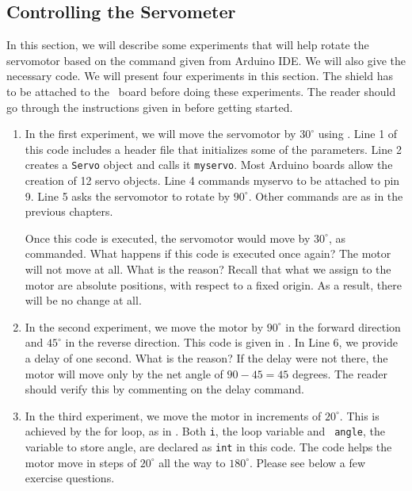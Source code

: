 \subsection{Controlling the Servometer}
\label{sec:servo-ard}
In this section, we will describe some experiments that will help
rotate the servomotor based on the command given from Arduino IDE.  We
will also give the necessary code.  We will present four experiments
in this section.  The shield has to be attached to the \arduino\ board
before doing these experiments.  The reader should go through the
instructions given in  before getting started.
\begin{enumerate}
\item In the first experiment, we will move the servomotor by
  $30^\circ$ using .  Line 1 of this code
  includes a header file that initializes some of the parameters.
  Line 2 creates a {\tt Servo} object and calls it {\tt myservo}.
  Most Arduino boards allow the creation of 12 servo objects.  Line 4
  commands myservo to be attached to pin 9.  Line 5 asks the
  servomotor to rotate by $90^\circ$.  Other commands are as in the
  previous chapters.

  Once this code is executed, the servomotor would move by
  $30^\circ$, as commanded.  What happens if this code is executed
  once again?  The motor will not move at all.  What is the reason?
  Recall that what we assign to the motor are absolute positions, with
  respect to a fixed origin.  As a result, there will be no change at
  all. 

\item In the second experiment, we move the motor by $90^\circ$ in the
  forward direction and $45^\circ$ in the reverse direction.  This
  code is given in .  In Line 6, we provide
  a delay of one second.  What is the reason?  If the delay were not
  there, the motor will move only by the net angle of $90-45 = 45$
  degrees.  The reader should verify this by commenting on the delay
  command.

\item In the third experiment, we move the motor in increments of
  $20^\circ$.  This is achieved by the for loop, as in
  .  Both {\tt i}, the loop variable and {\tt
    angle}, the variable to store angle, are declared as {\tt int} in
  this code.  The code helps the motor move in steps of $20^\circ$ all
  the way to $180^\circ$.  Please see below a few exercise questions.


\end{enumerate}

